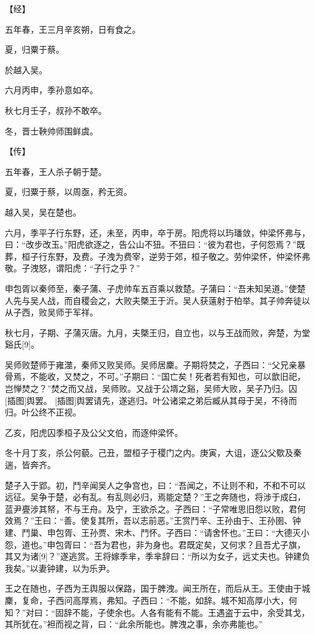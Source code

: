 \documentclass[a4paper,12pt,UTF8,twoside]{ctexbook}
\begin{document}
【经】

五年春，王三月辛亥朔，日有食之。

夏，归粟于蔡。

於越入吴。

六月丙申，季孙意如卒。

秋七月壬子，叔孙不敢卒。

冬，晋士鞅帅师围鲜虞。

【传】

五年春，王人杀子朝于楚。

夏，归粟于蔡，以周亟，矜无资。

越入吴，吴在楚也。

六月，季平子行东野，还，未至，丙申，卒于房。阳虎将以玙璠敛，仲梁怀弗与，曰：“改步改玉。”阳虎欲逐之，告公山不狃。不狃曰：“彼为君也，子何怨焉？”既葬，桓子行东野，及费。子洩为费宰，逆劳于郊，桓子敬之。劳仲梁怀，仲梁怀弗敬。子洩怒，谓阳虎：“子行之乎？”

申包胥以秦师至，秦子蒲、子虎帅车五百乘以救楚。子蒲曰：“吾未知吴道。”使楚人先与吴人战，而自稷会之，大败夫槩王于沂。吴人获薳射于柏举。其子帅奔徒以从子西，败吴师于军祥。

秋七月，子期、子蒲灭唐。九月，夫槩王归，自立也，以与王战而败，奔楚，为堂谿氏[9]。

吴师败楚师于雍澨，秦师又败吴师。吴师居麇。子期将焚之，子西曰：“父兄亲暴骨焉，不能收，又焚之，不可。”子期曰：“国亡矣！死者若有知也，可以歆旧祀，岂惮焚之？”焚之而又战，吴师败。又战于公壻之谿，吴师大败，吴子乃归。囚 [插图]舆罢。 [插图]舆罢请先，遂逃归。叶公诸梁之弟后臧从其母于吴，不待而归。叶公终不正视。

乙亥，阳虎囚季桓子及公父文伯，而逐仲梁怀。

冬十月丁亥，杀公何藐。己丑，盟桓子于稷门之内。庚寅，大诅，逐公父歜及秦遄，皆奔齐。

楚子入于郢。初，鬥辛闻吴人之争宫也，曰：“吾闻之，不让则不和，不和不可以远征。吴争于楚，必有乱。有乱则必归，焉能定楚？”王之奔随也，将涉于成臼，蓝尹亹涉其帑，不与王舟。及宁，王欲杀之。子西曰：“子常唯思旧怨以败，君何效焉？”王曰：“善。使复其所，吾以志前恶。”王赏鬥辛、王孙由于、王孙圉、钟建、鬥巢、申包胥、王孙贾、宋木、鬥怀。子西曰：“请舍怀也。”王曰：“大德灭小怨，道也。”申包胥曰：“吾为君也，非为身也。君既定矣，又何求？且吾尤子旗，其又为诸[9]？”遂逃赏。王将嫁季芈，季芈辞曰：“所以为女子，远丈夫也。钟建负我矣。”以妻钟建，以为乐尹。

王之在随也，子西为王舆服以保路，国于脾洩。闻王所在，而后从王。王使由于城麇，复命，子西问高厚焉，弗知。子西曰：“不能，如辞。城不知高厚小大，何知？”对曰：“固辞不能，子使余也。人各有能有不能。王遇盗于云中，余受其戈，其所犹在。”袒而视之背，曰：“此余所能也。脾洩之事，余亦弗能也。”
\end{document}
